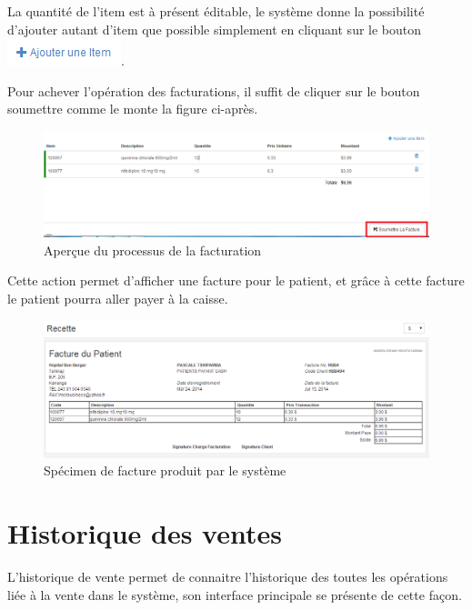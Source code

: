 \documentclass[12pt,a4paper]{report}
\begin{document}
La quantité de l'item est à présent éditable, le système donne la possibilité d'ajouter autant d'item que possible simplement en cliquant sur le bouton 
\includegraphics[scale=0.7]{pic/PlusAddItem.png}.
 
Pour achever l'opération des facturations, il suffit de cliquer sur le bouton soumettre comme le monte la figure ci-après.

\begin{figure}[h]
\begin{center}
\includegraphics[width=14cm]{pic/InterfaceSoumettreFacture.png}
\end{center}
\caption{Aperçue du processus de la facturation}
\label{Aperçue du processus de la facturation}
\end{figure}

Cette action permet d'afficher une facture pour le patient, et grâce à cette facture le patient pourra aller payer à la caisse.


\begin{figure}[h]
\begin{center}
\includegraphics[width=14cm]{pic/InvoiceView.png}
\end{center}
\caption{Spécimen de facture produit par le système}
\label{Spécimen de facture produit par le système}
\end{figure}

\newpage

\section{Historique des ventes}
L'historique de vente permet de connaitre l'historique des toutes les opérations liée à la vente dans le système, son interface principale se présente de cette façon.
\end{document}
